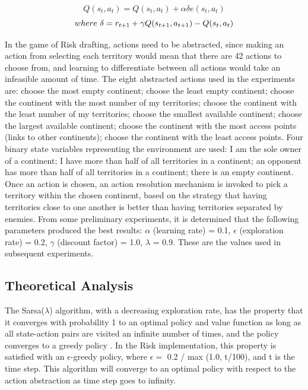 \documentclass[letterpaper]{article}
\numberwithin{equation}{section}
\numberwithin{theorem}{section}
\numberwithin{lemma}{section}
\numberwithin{df}{section}
\begin{document}
\[ Q(s_t, a_t) = Q(s_t, a_t) + {\alpha} {\delta} e(s_t, a_t) \]
\[ where \ {\delta} = r_{t+1} + \\ {\gamma}Q(s_{t+1}, a_{t+1}) - Q(s_t, a_t) \]

In the game of Risk drafting, actions need to be abstracted, since making an action from selecting each territory would mean that there are 42 actions to choose from, and learning to differentiate between all actions would take an infeasible amount of time.  The eight abstracted actions used in the experiments are: choose the most empty continent; choose the least empty continent; choose the continent with the most number of my territories; choose the continent with the least number of my territories; choose the smallest available continent; choose the largest available continent; choose the continent with the most access points (links to other continents); choose the continent with the least access points.  Four binary state variables representing the environment are used: I am the sole owner of a continent; I have more than half of all territories in a continent; an opponent has more than half of all territories in a continent; there is an empty continent.  Once an action is chosen, an action resolution mechanism is invoked to pick a territory within the chosen continent, based on the strategy that having territories close to one another is better than having territories separated by enemies.
From some preliminary experiments, it is determined that the following parameters produced the best results: $\alpha$ (learning rate) = 0.1, $\epsilon$ (exploration rate) = 0.2, $\gamma$ (discount factor) = 1.0, $\lambda$ = 0.9.  These are the values used in subsequent experiments.

\subsection{Theoretical Analysis}

The Sarsa($\lambda$) algorithm, with a decreasing exploration rate, has the property that it converges with probability 1 to an optimal policy and value function as long as all state-action pairs are visited an infinite number of times, and the policy converges to a greedy policy  \cite{SuttonBarto1998}.  In the Risk implementation, this property is satisfied with an $\epsilon$-greedy policy, where $\epsilon =$ 0.2 / max (1.0, t/100), and t is the time step.  This algorithm will converge to an optimal policy with respect to the action abstraction as time step goes to infinity. 
\end{document}
